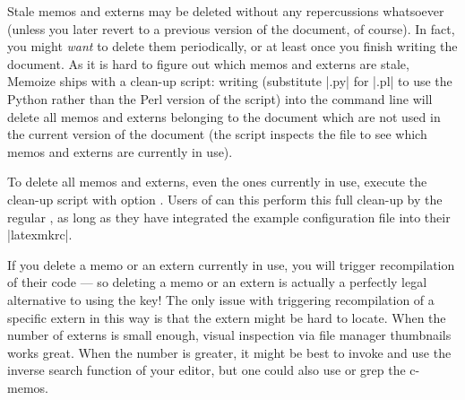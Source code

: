 \documentclass[a4paper,11pt]{article}
\begin{document}
Stale memos and externs may be deleted without any repercussions whatsoever
(unless you later revert to a previous version of the document, of course).  In
fact, you might \emph{want} to delete them periodically, or at least once you
finish writing the document.  As it is hard to figure out which memos and
externs are stale, Memoize ships with a clean-up script: writing
  (substitute |.py|
for |.pl| to use the Python rather than the Perl version of the script) into
the command line will delete all memos and externs belonging to the document
which are not used in the current version of the document (the script inspects
the \dmmz file to see which memos and externs are currently in use).

To delete all memos and externs, even the ones currently in use, execute the
clean-up script with option .  Users of
 can this perform this full clean-up by the regular , as long as they have integrated the example configuration file
 into their |latexmkrc|.

If you delete a memo or an extern currently in use, you will trigger
recompilation of their code --- so deleting a memo or an extern is actually a
perfectly legal alternative to using the  key!  The only
issue with triggering recompilation of a specific extern in this way is that
the extern might be hard to locate.  When the number of externs is small
enough, visual inspection via file manager thumbnails works great.  When the
number is greater, it might be best to invoke  and
use the inverse search function of your  editor, but one could also
use  or grep the c-memos.

\end{document}
